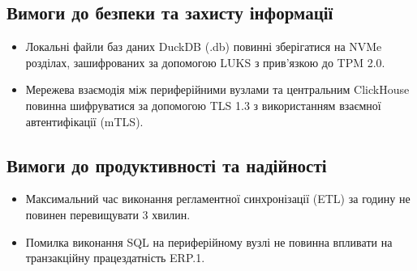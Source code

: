 \documentclass{article}
\begin{document}
\subsection{Вимоги до безпеки та захисту інформації}
\begin{itemize}
    \item Локальні файли баз даних DuckDB (.db) повинні зберігатися на NVMe розділах, зашифрованих за допомогою LUKS з прив'язкою до TPM 2.0.
    \item Мережева взаємодія між периферійними вузлами та центральним ClickHouse повинна шифруватися за допомогою TLS 1.3 з використанням взаємної автентифікації (mTLS).
\end{itemize}

\subsection{Вимоги до продуктивності та надійності}
\begin{itemize}
    \item Максимальний час виконання регламентної синхронізації (ETL) за годину не повинен перевищувати 3 хвилин.
    \item Помилка виконання SQL на периферійному вузлі не повинна впливати на транзакційну працездатність ERP.1.
\end{itemize}
\end{document}
